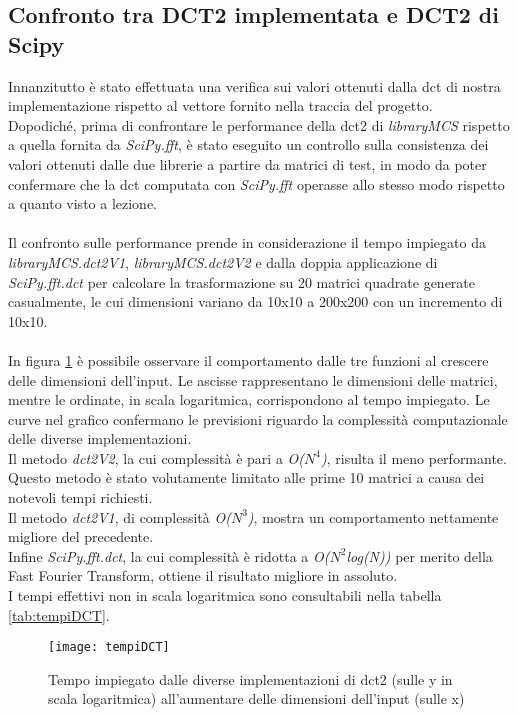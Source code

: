\subsection{Confronto tra DCT2 implementata e DCT2 di Scipy}\label{confronto}
Innanzitutto è stato effettuata una verifica sui valori ottenuti dalla dct di nostra implementazione rispetto al vettore fornito nella traccia del progetto.\\
Dopodiché, prima di confrontare le performance della dct2 di \emph{libraryMCS} rispetto a quella fornita da \emph{SciPy.fft}, è stato eseguito un controllo sulla consistenza dei valori ottenuti dalle due librerie a partire da matrici di test, in modo da poter confermare che la dct computata con \emph{SciPy.fft} operasse allo stesso modo rispetto a quanto visto a lezione.\\\\
Il confronto sulle performance prende in considerazione il tempo impiegato da \emph{libraryMCS.dct2V1}, \emph{libraryMCS.dct2V2} e dalla doppia applicazione di \emph{SciPy.fft.dct} per calcolare la trasformazione su 20 matrici quadrate generate casualmente, le cui dimensioni variano da 10x10 a 200x200 con un incremento di 10x10. 
\\\\
In figura \ref{fig:tempiDCT} è possibile osservare il comportamento dalle tre funzioni al crescere delle dimensioni dell'input. Le ascisse rappresentano le dimensioni delle matrici, mentre le ordinate, in scala logaritmica, corrispondono al tempo impiegato.
Le curve nel grafico confermano le previsioni riguardo la complessità computazionale delle diverse implementazioni.\\
Il metodo \emph{dct2V2}, la cui complessità è pari a \emph{O($N^{4}$)}, risulta il meno performante. 
Questo metodo è stato volutamente limitato alle prime 10 matrici a causa dei notevoli tempi richiesti.\\
Il metodo \emph{dct2V1}, di complessità \emph{O($N^{3}$)}, mostra un comportamento nettamente migliore del precedente.\\
Infine \emph{SciPy.fft.dct}, la cui complessità è ridotta a \emph{O($N^{2}$log(N))} per merito della Fast Fourier Transform, ottiene il risultato migliore in assoluto. \\
I tempi effettivi non in scala logaritmica sono consultabili nella tabella \ref{tab:tempiDCT}.

\begin{figure}[H]
    \texttt{[image: tempiDCT]}\centering
    \caption{Tempo impiegato dalle diverse implementazioni di dct2 (sulle y in scala logaritmica) all'aumentare delle dimensioni dell'input (sulle x)}\label{fig:tempiDCT}
\end{figure}

